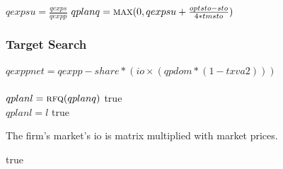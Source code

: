 \documentclass{article}
\begin{document}
\begin{algorithm}[H]
\caption{Init Prodplan}
    \begin{algorithmic}
        \State \(qexpsu = \frac{qexps}{qexpp}\)
        \State \(qplanq = \Call{max}{0, qexpsu + \frac{optsto - sto}{4 * tmsto}}\)
        \EndFunction
    \end{algorithmic}
\end{algorithm}


\subsubsection{Target Search}

\begin{algorithm}[H]
\caption{Target Search}
    \begin{algorithmic}
        \State \(qexppnet = qexpp - share * (io \times (qpdom * (1 - txva2)))\)
        \\
        \State \Return {}
        \EndIf
        \\
                \State \(qplanl = \Call{rfq}{qplanq}\)
                \State {}
                \State \Return true
            \EndIf
            \State \Return {}
        \EndIf
        \\
            \State \(qplanl = l\)
            \State {}
            \State \Return true
        \EndIf
        \\
        \State \Return {}
        \EndFunction
    \end{algorithmic}
    \small The firm's market's io is matrix multiplied with market prices.
\end{algorithm}

\begin{algorithm}[!htbp]
\caption{Plan Implies Recruitment}
    \begin{algorithmic}
            \State {}
            \State {}
            \State \Return true
        \EndIf
        \State \Return {}
        \EndFunction
    \end{algorithmic}
\end{algorithm}
\end{document}
